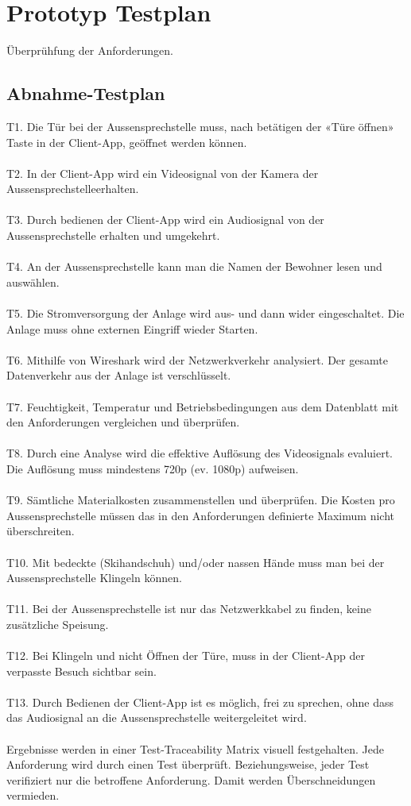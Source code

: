 \section{Prototyp Testplan}
\label{sec:testabnahme}
Überprühfung der Anforderungen.
\subsection{Abnahme-Testplan}
T1. Die Tür bei der Aussensprechstelle muss, nach betätigen der «Türe öffnen» Taste in der Client-App, geöffnet werden können.
\\
\\
T2. In der Client-App wird ein Videosignal von der Kamera der Aussensprechstelleerhalten.
\\
\\
T3. Durch bedienen der Client-App wird ein Audiosignal von der Aussensprechstelle erhalten und umgekehrt.
\\
\\
T4. An der Aussensprechstelle kann man die Namen der Bewohner lesen und auswählen. 
\\
\\
T5. Die Stromversorgung der Anlage wird aus- und dann wider eingeschaltet. Die Anlage muss ohne externen Eingriff wieder Starten.
\\
\\
T6. Mithilfe von Wireshark wird der Netzwerkverkehr analysiert. Der gesamte Datenverkehr aus der Anlage ist verschlüsselt.
\\
\\
T7. Feuchtigkeit, Temperatur und Betriebsbedingungen aus dem Datenblatt mit den Anforderungen vergleichen und überprüfen.
\\
\\  
T8. Durch eine Analyse wird die effektive Auflösung des Videosignals evaluiert. Die Auflösung muss mindestens 720p (ev. 1080p) aufweisen.
\\
\\
T9. Sämtliche Materialkosten zusammenstellen und überprüfen. Die Kosten pro Aussensprechstelle müssen das in den Anforderungen definierte Maximum nicht überschreiten.
\\
\\
T10. Mit bedeckte (Skihandschuh) und/oder nassen Hände muss man bei der Aussensprechstelle Klingeln können. 
\\
\\
T11. Bei der Aussensprechstelle ist nur das Netzwerkkabel zu finden, keine zusätzliche Speisung.
\\
\\
T12. Bei Klingeln und nicht Öffnen der Türe, muss in der Client-App der verpasste Besuch sichtbar sein.
\\
\\
T13. Durch Bedienen der Client-App ist es möglich, frei zu sprechen, ohne dass das Audiosignal an die Aussensprechstelle weitergeleitet wird.
\\
\\
Ergebnisse werden in einer Test-Traceability Matrix visuell festgehalten. Jede Anforderung
wird durch einen Test überprüft. Beziehungsweise, jeder Test verifiziert nur die betroffene Anforderung. Damit werden Überschneidungen vermieden.


